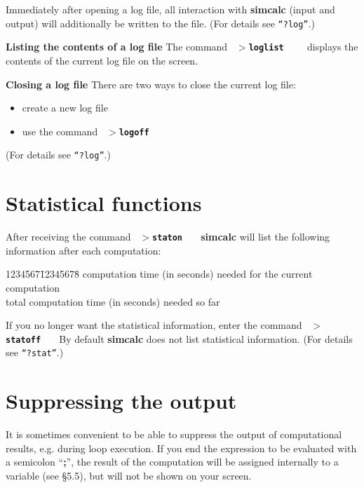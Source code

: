 Immediately after opening a log file, all interaction with {\bf simcalc} (input and output)
will additionally be written to the file. (For details see {\tt ``?log''}.)

\leer\leer
{\bf Listing the contents of a log file}
\leer
The command
\leer
{\tt
  {\bf $>$loglist }\ \ \care
}
\leer
displays the contents of the current log file on the screen. 

\newpage

\leer\leer
{\bf Closing a log file}
\leer
There are two ways to close the current log file:
\begin{itemize}
   \item create a new log file
   \item use the command
\leer
{\tt
  {\bf $>$logoff }\ \ \care {}\Spp{}\ \ \care
}
\end{itemize}
(For details see {\tt ``?log''}.)



\section{Statistical functions}
After receiving the command 
\leer
{\tt
  {\bf $>$staton}\ \ \care
}
\leer
{\bf simcalc} will list the following information after each computation:

\begin{tabbing}
1234567\=12345678\=\kill
\> computation time (in seconds) needed for the current computation\\
\> total computation time (in seconds) needed so far\\
\end{tabbing}

If you no longer want the statistical information, enter the command 
\leer
{\tt
  {\bf $>$statoff}\ \  \care
}
\leer
By default {\bf simcalc} does not list statistical information. (For details see
{\tt ``?stat''}.)


\section{Suppressing the output}
It is sometimes convenient to be able to suppress the output of computational results,
e.g. during loop execution. If you end the expression to be evaluated with a semicolon ``{\bf ;}'',
the result of the computation will be assigned internally to a variable (see \S 5.5), but will
not be shown on your screen.

